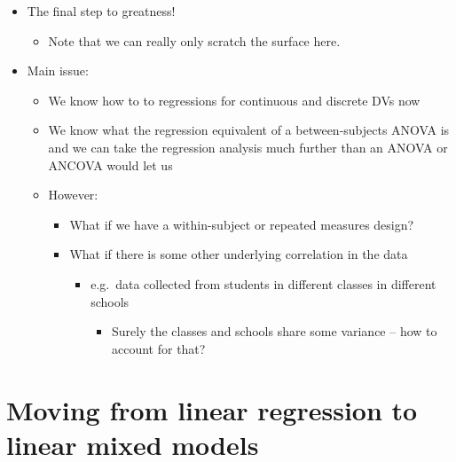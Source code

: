 \documentclass[]{article}
\begin{document}
\begin{itemize}
\itemsep1pt\parskip0pt
\item
  The final step to greatness!

  \begin{itemize}
  \itemsep1pt\parskip0pt
  \item
    Note that we can really only scratch the surface here.
  \end{itemize}
\item
  Main issue:

  \begin{itemize}
  \itemsep1pt\parskip0pt
  \item
    We know how to to regressions for continuous and discrete DVs now
  \item
    We know what the regression equivalent of a between-subjects ANOVA
    is and we can take the regression analysis much further than an
    ANOVA or ANCOVA would let us
  \item
    However:

    \begin{itemize}
    \itemsep1pt\parskip0pt
    \item
      What if we have a within-subject or repeated measures design?
    \item
      What if there is some other underlying correlation in the data

      \begin{itemize}
      \itemsep1pt\parskip0pt
      \item
        e.g.~data collected from students in different classes in
        different schools

        \begin{itemize}
        \itemsep1pt\parskip0pt
        \item
          Surely the classes and schools share some variance -- how to
          account for that?
        \end{itemize}
      \end{itemize}
    \end{itemize}
  \end{itemize}
\end{itemize}

\section{Moving from linear regression to linear mixed
models}\label{moving-from-linear-regression-to-linear-mixed-models}
\end{document}

